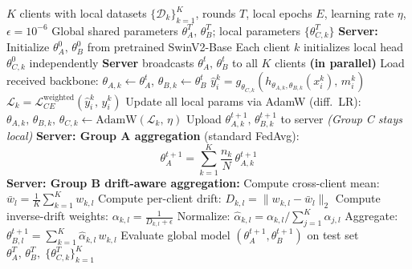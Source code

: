 \documentclass{ieeeaccess}
\newcommand{\sadrift}{FedSA-Drift}
\begin{document}
\begin{algorithm}[t]
\caption{\sadrift{}: Structure-Aware Drift-Regularized Federated Training}
\label{alg:federated}
\begin{algorithmic}[1]
\REQUIRE $K$ clients with local datasets $\{\mathcal{D}_k\}_{k=1}^K$, rounds $T$, local epochs $E$, learning rate $\eta$, $\epsilon = 10^{-6}$
\ENSURE Global shared parameters $\theta_A^T,\, \theta_B^T$; local parameters $\{\theta_{C,k}^T\}$
\STATE \textbf{Server:} Initialize $\theta_A^0,\, \theta_B^0$ from pretrained SwinV2-Base
\STATE Each client $k$ initializes local head $\theta_{C,k}^0$ independently
    \STATE \textbf{Server} broadcasts $\theta_A^t,\, \theta_B^t$ to all $K$ clients
     \textbf{(in parallel)}
        \STATE Load received backbone: $\theta_{A,k} \leftarrow \theta_A^t$,\; $\theta_{B,k} \leftarrow \theta_B^t$
                \STATE $\hat{y}_i^k = g_{\theta_{C,k}}\!\left(h_{\theta_{A,k},\theta_{B,k}}(x_i^k),\, m_i^k\right)$
                \STATE $\mathcal{L}_k = \mathcal{L}_{CE}^{\text{weighted}}(\hat{y}_i^k,\, y_i^k)$
                \STATE Update all local params via AdamW (diff.\ LR):
                       $\theta_{A,k},\, \theta_{B,k},\, \theta_{C,k} \leftarrow \text{AdamW}(\mathcal{L}_k,\,\eta)$
            \ENDFOR
        \ENDFOR
        \STATE Upload $\theta_{A,k}^{t+1},\, \theta_{B,k}^{t+1}$ to server \quad \textit{(Group C stays local)}
    \ENDFOR
    \STATE \textbf{Server: Group A aggregation} (standard FedAvg):
           \[ \theta_A^{t+1} = \sum_{k=1}^{K} \frac{n_k}{N}\, \theta_{A,k}^{t+1} \]
    \STATE \textbf{Server: Group B drift-aware aggregation:}
        \STATE Compute cross-client mean:
               $\bar{w}_l = \frac{1}{K}\sum_{k=1}^{K} w_{k,l}$
        \STATE Compute per-client drift:
               $D_{k,l} = \|w_{k,l} - \bar{w}_l\|_2$
        \STATE Compute inverse-drift weights:
               $\alpha_{k,l} = \frac{1}{D_{k,l} + \epsilon}$
        \STATE Normalize:
               $\hat{\alpha}_{k,l} = \alpha_{k,l} \big/ \sum_{j=1}^{K} \alpha_{j,l}$
        \STATE Aggregate:
               $\theta_{B,l}^{t+1} = \sum_{k=1}^{K} \hat{\alpha}_{k,l}\, w_{k,l}$
    \ENDFOR
    \STATE Evaluate global model $(\theta_A^{t+1}, \theta_B^{t+1})$ on test set
\ENDFOR
\RETURN $\theta_A^T,\, \theta_B^T,\; \{\theta_{C,k}^T\}_{k=1}^K$
\end{algorithmic}
\end{algorithm}
\end{document}
